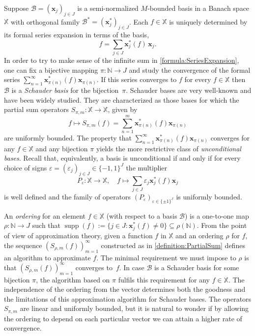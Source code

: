 \documentclass[11pt, leqno]{amsart}
\theoremstyle{remark}
\numberwithin{equation}{section}
\newcommand{\NN}{\ensuremath{\mathbb{N}}}
\newcommand{\XX}{\ensuremath{\mathbb{X}}}
\newcommand{\xx}{\ensuremath{\mathbf{x}}}
\newcommand{\BB}{\mathcal{B}}
\newcommand{\supp}{\operatorname{supp}}
\begin{document}
Suppose $\BB=(\xx_j)_{j\in J}$ is a semi-normalized $M$-bounded basis in a Banach space $\XX$ with orthogonal family
$\BB^*=(\xx_j^*)_{j\in J}$.
 Each $f\in \XX$ is uniquely determined by its formal series expansion in terms of the basis,
\begin{equation}
\label{formula:SeriesExpansion}
f=\sum_{j\in J} \xx_j^*(f) \, \xx_j.
\end{equation}
In order to try to make sense of the infinite sum in \eqref{formula:SeriesExpansion}, one can fix a bijective mapping $\pi\colon\NN\to J$ and study the convergence of the formal series
$\sum_{n=1}^\infty \xx_{\pi(n)}^*(f)\xx_{\pi(n)}$. If this series converges to $f$ for every $f\in\XX$ then $\BB$ is a \textit{Schauder basis} for the bijection~$\pi$. Schauder  bases are very well-known and have been widely studied. They are characterized as those bases for which the partial sum operators $S_{\pi,m}\colon\XX\to\XX$, given by
\begin{equation}
\label{definition:PartialSum}
f\mapsto S_{\pi,m}(f)= \sum_{n=1}^m \xx_{\pi(n)}^*(f)\xx_{\pi(n)}
\end{equation}
are uniformly bounded. The property that  $\sum_{n=1}^\infty \xx_{\pi(n)}^*(f)\xx_{\pi(n)}$ converges for any $f\in\XX$ and any bijection $\pi$ yields the more restrictive
class of \textit{unconditional bases}. Recall that, equivalently,  a basis is unconditional if and only if
for every choice of signs $\varepsilon=(\varepsilon_j)_{j\in J}\in\{-1,1\}^J$ the multiplier
\[
P_\varepsilon\colon \XX\to \XX, \quad f\mapsto \sum_{j\in J} \varepsilon_j\xx_j^*(f) \xx_j
\]
is well defined and the family of operators $(P_\varepsilon)_{\varepsilon\in \{\pm 1\}^J}$ is uniformly bounded.

An \textit{ordering} for an element $f\in\XX$ (with respect to a basis $\BB$) is a one-to-one map $\rho\colon\NN\to J$ such that $\supp(f) := \{j\in J : \xx_j^*(f)\not=0\} \subseteq \rho(\NN)$.
From the point of view of  approximation theory, given a function $f$ in $\XX$ and an ordering $\rho$ for $f$, the sequence $(S_{\rho,m}(f))_{m=1}^\infty$
constructed as in \eqref{definition:PartialSum} defines an algorithm to approximate $f$. The minimal requirement we must impose to $\rho$ is that  $(S_{\rho,m}(f))_{m=1}^\infty$ converges to~$f$. In case $\BB$ is a Schauder basis for some bijection $\pi$, the algorithm based on $\pi$ fulfils this requirement for any $f\in\XX$. The independence of the ordering from the vector determines both the goodness and the limitations of this approximation algorithm for Schauder bases. The operators $S_{\pi,m}$ are linear and uniformly bounded,
but it is natural to wonder if by allowing the ordering to depend on each particular vector we can attain a higher rate of convergence.
\end{document}
